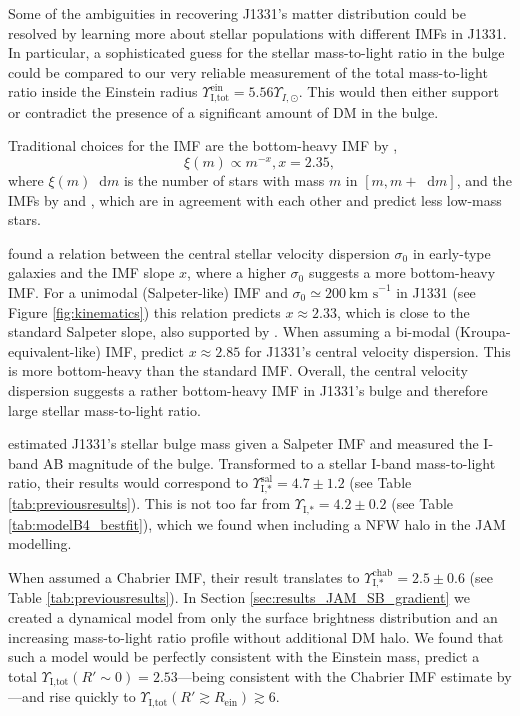 \documentclass[useAMS,usenatbib]{mnras}
\newcommand*\diff{\mathop{}\!\mathrm{d}}
\begin{document}
Some of the ambiguities in recovering J1331's matter distribution could be resolved by learning more about stellar populations with different IMFs in J1331. In particular, a sophisticated guess for the stellar mass-to-light ratio in the bulge could be compared to our very reliable measurement of the total mass-to-light ratio inside the Einstein radius $\Upsilon_\text{I,tot}^\text{ein} = 5.56 \Upsilon_{I,\odot}$. This would then either support or contradict the presence of a significant amount of DM in the bulge.

Traditional choices for the IMF are the bottom-heavy IMF by \citet{Salpeter1955},
$$\xi(m) \propto m^{-x}, x=2.35,$$
where $\xi(m) \diff m$ is the number of stars with mass $m$ in $[m,m+\diff m]$, and the IMFs by \citet{2002Sci...295...82K} and \citet{Chabrier2003}, which are in agreement with each other and predict less low-mass stars.

\citet{Ferreras} found a relation between the central stellar velocity dispersion $\sigma_0$ in early-type galaxies and the IMF slope $x$, where a higher $\sigma_0$ suggests a more bottom-heavy IMF. For a unimodal (Salpeter-like) IMF and $\sigma_0 \simeq 200~\text{km s}^{-1}$ in J1331 (see Figure \ref{fig:kinematics}) this relation predicts $x \approx 2.33$, which is close to the standard Salpeter slope, also supported by \citet{2014MNRAS.438.1483S}. When assuming a bi-modal (Kroupa-equivalent-like) IMF, \citet{Ferreras} predict $x \approx 2.85$ for J1331's central velocity dispersion. This is more bottom-heavy than the standard \citet{2002Sci...295...82K} IMF. Overall, the central velocity dispersion suggests a rather bottom-heavy IMF in J1331's bulge and therefore large stellar mass-to-light ratio. 

\citet{SWELLSI} estimated J1331's stellar bulge mass given a Salpeter IMF and measured the I-band AB magnitude of the bulge. Transformed to a stellar I-band mass-to-light ratio, their results would correspond to $\Upsilon_\text{I,*}^\text{sal} = 4.7 \pm 1.2$ (see Table \ref{tab:previousresults}). This is not too far from $\Upsilon_\text{I,*} = 4.2 \pm 0.2$ (see Table \ref{tab:modelB4_bestfit}), which we found when including a NFW halo in the JAM modelling.

When \citet{SWELLSI} assumed a Chabrier IMF, their result translates to $\Upsilon_\text{I,*}^\text{chab} = 2.5 \pm 0.6$ (see Table \ref{tab:previousresults}). In Section \ref{sec:results_JAM_SB_gradient} we created a dynamical model from only the surface brightness distribution and an increasing mass-to-light ratio profile without additional DM halo. We found that such a model would be perfectly consistent with the Einstein mass, predict a total $\Upsilon_\text{I,tot}(R'\sim0) = 2.53$---being consistent with the Chabrier IMF estimate by \citet{SWELLSI}---and rise quickly to $\Upsilon_\text{I,tot}(R'\gtrsim R_\text{ein}) \gtrsim 6$.
\end{document}

